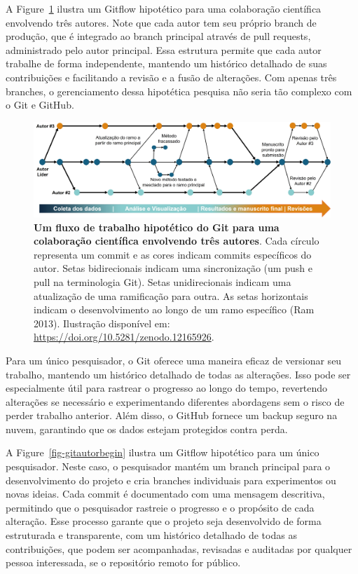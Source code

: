 \documentclass[
  a4paper,
]{article}
\begin{document}
A Figure~\ref{fig-git3autores} ilustra um Gitflow hipotético para uma
colaboração científica envolvendo três autores. Note que cada autor tem
seu próprio branch de produção, que é integrado ao branch principal
através de pull requests, administrado pelo autor principal. Essa
estrutura permite que cada autor trabalhe de forma independente,
mantendo um histórico detalhado de suas contribuições e facilitando a
revisão e a fusão de alterações. Com apenas três branches, o
gerenciamento dessa hipotética pesquisa não seria tão complexo com o Git
e GitHub.

\begin{figure}

\includegraphics{img/git3autores.jpg}

\caption{\label{fig-git3autores}\textbf{Um fluxo de trabalho hipotético
do Git para uma colaboração científica envolvendo três autores}. Cada
círculo representa um commit e as cores indicam commits específicos do
autor. Setas bidirecionais indicam uma sincronização (um push e pull na
terminologia Git). Setas unidirecionais indicam uma atualização de uma
ramificação para outra. As setas horizontais indicam o desenvolvimento
ao longo de um ramo específico (Ram 2013). Ilustração disponível em:
\url{https://doi.org/10.5281/zenodo.12165926}.}

\end{figure}%

Para um único pesquisador, o Git oferece uma maneira eficaz de versionar
seu trabalho, mantendo um histórico detalhado de todas as alterações.
Isso pode ser especialmente útil para rastrear o progresso ao longo do
tempo, revertendo alterações se necessário e experimentando diferentes
abordagens sem o risco de perder trabalho anterior. Além disso, o GitHub
fornece um backup seguro na nuvem, garantindo que os dados estejam
protegidos contra perda.

A Figure~\ref{fig-gitautorbegin} ilustra um Gitflow hipotético para um
único pesquisador. Neste caso, o pesquisador mantém um branch principal
para o desenvolvimento do projeto e cria branches individuais para
experimentos ou novas ideias. Cada commit é documentado com uma mensagem
descritiva, permitindo que o pesquisador rastreie o progresso e o
propósito de cada alteração. Esse processo garante que o projeto seja
desenvolvido de forma estruturada e transparente, com um histórico
detalhado de todas as contribuições, que podem ser acompanhadas,
revisadas e auditadas por qualquer pessoa interessada, se o repositório
remoto for público.
\end{document}
